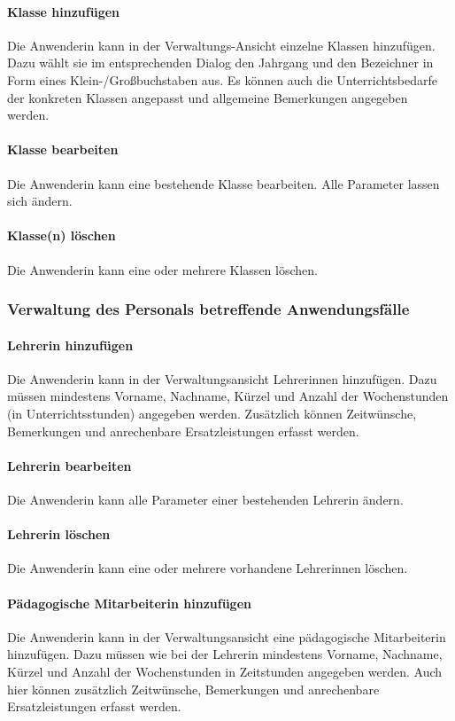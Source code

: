 \documentclass[fontsize=12pt,paper=a4,twoside]{scrartcl}
\begin{document}
\paragraph{Klasse hinzufügen} Die Anwenderin kann in der Verwaltungs-Ansicht einzelne Klassen hinzufügen. Dazu wählt sie im entsprechenden Dialog den Jahrgang und den Bezeichner in Form eines Klein-/Großbuchstaben aus. Es können auch die Unterrichtsbedarfe der konkreten Klassen angepasst und allgemeine Bemerkungen angegeben werden.

\paragraph{Klasse bearbeiten} Die Anwenderin kann eine bestehende Klasse bearbeiten. Alle Parameter lassen sich ändern.

\paragraph{Klasse(n) löschen} Die Anwenderin kann eine oder mehrere Klassen löschen.

\subsubsection{Verwaltung des Personals betreffende Anwendungsfälle}

\paragraph{Lehrerin hinzufügen}
Die Anwenderin kann in der Verwaltungsansicht Lehrerinnen hinzufügen. Dazu müssen mindestens Vorname, Nachname, Kürzel und Anzahl der Wochenstunden (in Unterrichtsstunden) angegeben werden. Zusätzlich können Zeitwünsche, Bemerkungen und anrechenbare Ersatzleistungen erfasst werden.

\paragraph{Lehrerin bearbeiten}
Die Anwenderin kann alle Parameter einer bestehenden Lehrerin ändern.

\paragraph{Lehrerin löschen}
Die Anwenderin kann eine oder mehrere vorhandene Lehrerinnen löschen.

\paragraph{Pädagogische Mitarbeiterin hinzufügen}
Die Anwenderin kann in der Verwaltungsansicht eine pädagogische Mitarbeiterin hinzufügen. Dazu müssen wie bei der Lehrerin mindestens Vorname, Nachname, Kürzel und Anzahl der Wochenstunden in Zeitstunden angegeben werden. Auch hier können zusätzlich Zeitwünsche, Bemerkungen und anrechenbare Ersatzleistungen erfasst werden.
\end{document}
